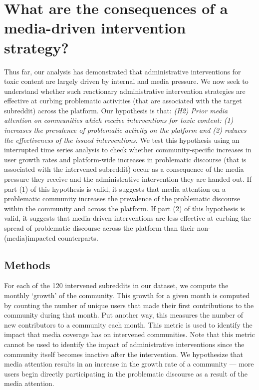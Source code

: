 \section{What are the consequences of a media-driven intervention strategy?}
\label{sec:consequences}

Thus far, our analysis has demonstrated that administrative interventions
for toxic content are largely driven by internal and media pressure. We now
seek to understand whether such reactionary administrative
intervention strategies are effective at curbing problematic activities (that
are associated with the target subreddit) across the platform. Our hypothesis
is that: \emph{(H2) Prior media attention on communities which receive
interventions for toxic content: (1) increases the prevalence of problematic
activity on the platform and (2) reduces the effectiveness of the issued
interventions.} We test this hypothesis using an interrupted time series
analysis to check whether community-specific increases in user growth rates
and platform-wide increases in problematic discourse (that is associated with
the intervened subreddit) occur as a consequence of the media pressure they
receive and the administrative intervention they are handed out. If
part (1) of this hypothesis is valid, it suggests that media attention
on a problematic community increases the prevalence of the problematic
discourse within the community and across the platform. If part (2) of this
hypothesis is valid, it suggests that media-driven interventions are less
effective at curbing the spread of problematic discourse across the platform
than their non-(media)impacted counterparts.

\subsection{Methods} \label{sec:consequences:methods}

 For each of the
120 intervened subreddits in our dataset, we compute the monthly `growth' of
the community. 
This growth for a given month is computed by counting the number of unique
users that made their first contributions to the community during that month.
Put another way, this measures the number of new contributors to a community
each month. This metric is used to identify the impact that media coverage has
on intervened communities. Note that this metric cannot be used to identify the
impact of administrative interventions since the community itself becomes
inactive after the intervention.
We hypothesize that media attention results in an
increase in the growth rate of a community --- \ie more users begin directly
participating in the problematic discourse as a result of the media attention.

